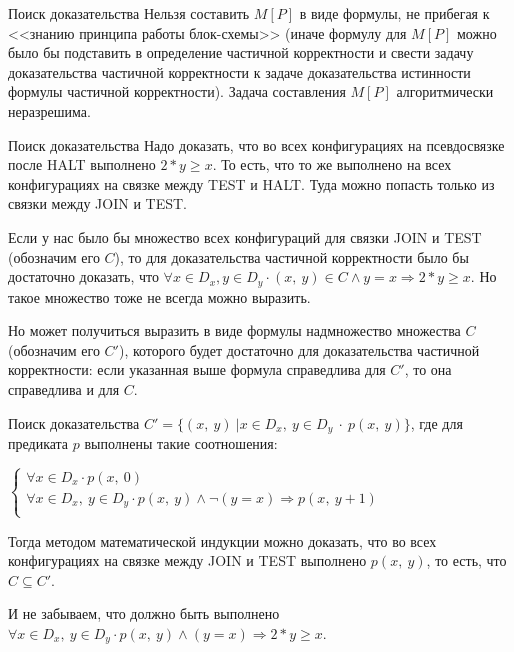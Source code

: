 \documentclass[hyperref={unicode=true}]{beamer}
\begin{document}
    \begin{frame}{Поиск доказательства}
    Нельзя составить $M[P]$ в виде формулы, не прибегая к <<знанию принципа работы блок-схемы>> (иначе формулу для $M[P]$ можно было бы подставить в определение частичной корректности и свести задачу доказательства частичной корректности к задаче доказательства истинности формулы частичной корректности). Задача составления $M[P]$ алгоритмически неразрешима.
    \end{frame}

    \begin{frame}{Поиск доказательства}
    Надо доказать, что во всех конфигурациях на псевдосвязке после HALT выполнено $2*y \geq x$. То есть, что то же выполнено на всех конфигурациях на связке между TEST и HALT. Туда можно попасть только из связки между JOIN и TEST.

    Если у нас было бы множество всех конфигураций для связки JOIN и TEST (обозначим его $C$), то для доказательства частичной корректности было бы достаточно доказать, что $\forall x \in D_x, y \in D_y \cdot (x,~y) \in C \land y = x \Rightarrow 2 * y \geq x$. Но такое множество тоже не всегда можно выразить.

    Но может получиться выразить в виде формулы надмножество множества $C$ (обозначим его $C'$), которого будет достаточно для доказательства частичной корректности: если указанная выше формула справедлива для $C'$, то она справедлива и для $C$.
    \end{frame}

    \begin{frame}{Поиск доказательства}
    $C' = \{(x,~y)~|x \in D_x,~y \in D_y~\cdot~p(x,~y)\}$, где для предиката $p$ выполнены такие соотношения:

    $\begin{cases}
    \forall x \in D_x \cdot p(x,~0)\\
    \forall x \in D_x,~y \in D_y \cdot p(x,~y) \land \neg (y = x) \Rightarrow p(x,~y + 1)\\
    \end{cases}$

    Тогда методом математической индукции можно доказать, что во всех конфигурациях на связке между JOIN и TEST выполнено $p(x,~y)$, то есть, что $C \subseteq C'$.

    И не забываем, что должно быть выполнено $\forall x \in D_x,~y \in D_y \cdot p(x,~y) \land (y = x) \Rightarrow 2 * y \geq x$.
    \end{frame}
\end{document}
